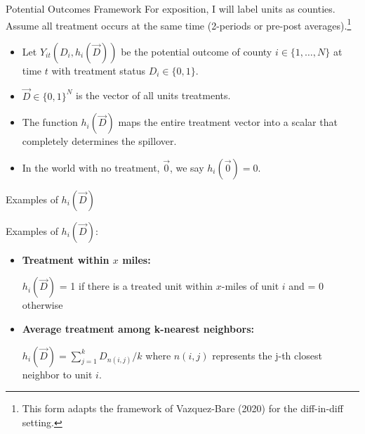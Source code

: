 \documentclass[aspectratio=43]{beamer}
\begin{document}




\begin{frame}{Potential Outcomes Framework}
    For exposition, I will label units as counties. Assume all treatment occurs at the same time (2-periods or pre-post averages).\footnote{This form adapts the framework of Vazquez-Bare (2020) for the diff-in-diff setting.}
    
    \begin{itemize}
        \item Let $Y_{it}(D_i, h_i(\vec{D}))$ be the potential outcome of county $i \in \{ 1, \dots, N \}$ at time $t$ with treatment status $D_i \in \{0, 1\}$.
        
        \item $\vec{D} \in \{0,1\}^N$ is the vector of all units treatments.
        
        \item The function $h_i(\vec{D})$ maps the entire treatment vector into a scalar that completely determines the spillover. 
        
        \item In the world with no treatment, $\vec{0}$, we say $h_i(\vec{0}) = 0$.
    \end{itemize}
\end{frame}

\begin{frame}{Examples of $h_i(\vec{D})$}
    
    Examples of $h_i(\vec{D})$:
    
    \begin{itemize}
        \item \textbf{Treatment within $x$ miles:}
        
        $h_i(\vec{D})$ = 1 if there is a treated unit within $x$-miles of unit $i$ and = 0 otherwise
            
        \item \textbf{Average treatment among k-nearest neighbors:}
        
        $h_i(\vec{D}) = \sum_{j = 1}^k D_{n(i,j)} / k$ where $n(i,j)$ represents the j-th closest neighbor to unit $i$. 


    \end{itemize}
\end{frame}
\end{document}
